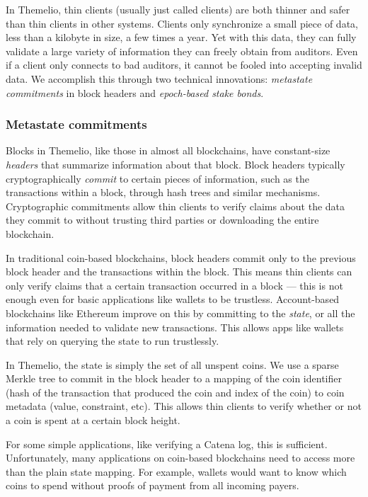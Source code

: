 \documentclass[headinclude]{scrbook}
\begin{document}
In Themelio, thin clients (usually just called clients) are both thinner and safer than thin clients in other systems. Clients only synchronize a small piece of data, less than a kilobyte in size, a few times a year. Yet with this data, they can fully validate a large variety of information they can freely obtain from auditors. Even if a client only connects to bad auditors, it cannot be fooled into accepting invalid data. We accomplish this through two technical innovations: \textit{metastate commitments} in block headers and \textit{epoch-based stake bonds}.

\subsubsection{Metastate commitments}

Blocks in Themelio, like those in almost all blockchains, have constant-size \textit{headers} that summarize information about that block. Block headers typically cryptographically \textit{commit} to certain pieces of information, such as the transactions within a block, through hash trees and similar mechanisms. Cryptographic commitments allow thin clients to verify claims about the data they commit to without trusting third parties or downloading the entire blockchain.

In traditional coin-based blockchains, block headers commit only to the previous block header and the transactions within the block. This means thin clients can only verify claims that a certain transaction occurred in a block --- this is not enough even for basic applications like wallets to be trustless. Account-based blockchains like Ethereum improve on this by committing to the \textit{state}, or all the information needed to validate new transactions. This allows apps like wallets that rely on querying the state to run trustlessly.

In Themelio, the state is simply the set of all unspent coins. We use a sparse Merkle tree to commit in the block header to a mapping of the coin identifier (hash of the transaction that produced the coin and index of the coin) to coin metadata (value, constraint, etc). This allows thin clients to verify whether or not a coin is spent at a certain block height.

For some simple applications, like verifying a Catena log, this is sufficient. Unfortunately, many applications on coin-based blockchains need to access more than the plain state mapping. For example, wallets would want to know which coins to spend without proofs of payment from all incoming payers.
\end{document}
